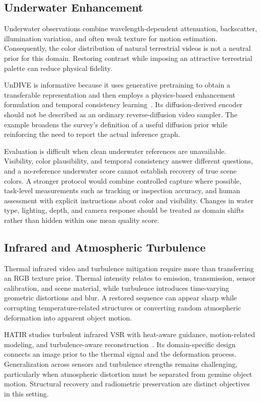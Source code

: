 \subsection{Underwater Enhancement}
Underwater observations combine wavelength-dependent attenuation, backscatter, illumination variation, and often weak texture for motion estimation. Consequently, the color distribution of natural terrestrial videos is not a neutral prior for this domain. Restoring contrast while imposing an attractive terrestrial palette can reduce physical fidelity.

UnDIVE is informative because it uses generative pretraining to obtain a transferable representation and then employs a physics-based enhancement formulation and temporal consistency learning~\cite{undive}. Its diffusion-derived encoder should not be described as an ordinary reverse-diffusion video sampler. The example broadens the survey's definition of a useful diffusion prior while reinforcing the need to report the actual inference graph.

Evaluation is difficult when clean underwater references are unavailable. Visibility, color plausibility, and temporal consistency answer different questions, and a no-reference underwater score cannot establish recovery of true scene colors. A stronger protocol would combine controlled capture where possible, task-level measurements such as tracking or inspection accuracy, and human assessment with explicit instructions about color and visibility. Changes in water type, lighting, depth, and camera response should be treated as domain shifts rather than hidden within one mean quality score.

\subsection{Infrared and Atmospheric Turbulence}
Thermal infrared video and turbulence mitigation require more than transferring an RGB texture prior. Thermal intensity relates to emission, transmission, sensor calibration, and scene material, while turbulence introduces time-varying geometric distortions and blur. A restored sequence can appear sharp while corrupting temperature-related structures or converting random atmospheric deformation into apparent object motion.

HATIR studies turbulent infrared VSR with heat-aware guidance, motion-related modeling, and turbulence-aware reconstruction~\cite{hatir}. Its domain-specific design connects an image prior to the thermal signal and the deformation process. Generalization across sensors and turbulence strengths remains challenging, particularly when atmospheric distortion must be separated from genuine object motion. Structural recovery and radiometric preservation are distinct objectives in this setting.

